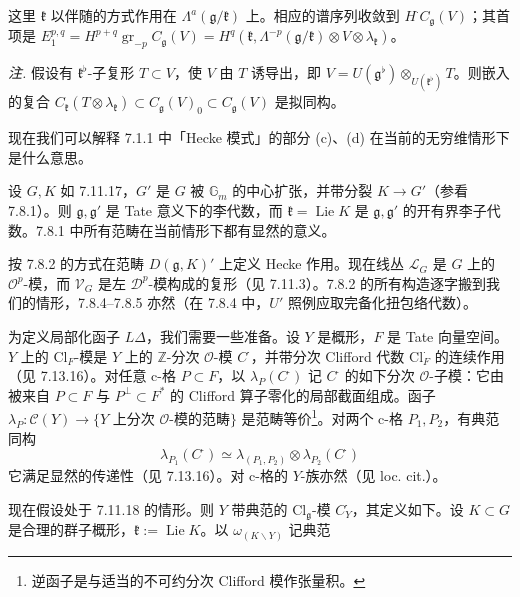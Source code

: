 这里 $\mathfrak{k}$ 以伴随的方式作用在 $\Lambda^{a}(\mathfrak{g}/\mathfrak{k})$ 上。相应的谱序列收敛到 $H^{\cdot}C_{\mathfrak{g}}(V)$；其首项是 $E^{p,q}_{1}=H^{p+q}\operatorname{gr}_{-p}C_{\mathfrak{g}}(V)=H^{q}(\mathfrak{k},\Lambda^{-p}(\mathfrak{g}/\mathfrak{k})\otimes V\otimes\lambda_{\mathfrak{k}})$。

 \emph{注.} 假设有 $\mathfrak{k}^{\flat}$-子复形 $T\subset V$，使 $V$ 由 $T$ 诱导出，即 $V=U(\mathfrak{g}^{\flat})\otimes_{U(\mathfrak{k}^{\flat})}T$。则嵌入的复合 $C_{\mathfrak{k}}(T\otimes\lambda_{\mathfrak{k}})\subset C_{\mathfrak{g}}(V)_{0}\subset C_{\mathfrak{g}}(V)$ 是拟同构。


 现在我们可以解释 7.1.1 中「Hecke 模式」的部分 (c)、(d) 在当前的无穷维情形下是什么意思。

 设 $G,K$ 如 7.11.17，$G'$ 是 $G$ 被 $\mathbb{G}_{m}$ 的中心扩张，并带分裂 $K\to G'$（参看 7.8.1）。则 $\mathfrak{g},\mathfrak{g}'$ 是 Tate 意义下的李代数，而 $\mathfrak{k}=\operatorname{Lie}K$ 是 $\mathfrak{g},\mathfrak{g}'$ 的开有界李子代数。7.8.1 中所有范畴在当前情形下都有显然的意义。

按 7.8.2 的方式在范畴 $D(\mathfrak{g},K)'$ 上定义 Hecke 作用。现在线丛 $\mathcal{L}_{G}$ 是 $G$ 上的 $\mathcal{O}^{p}$-模，而 $\mathcal{V}_{G}$ 是左 $\mathcal{D}^{p}$-模构成的复形（见 7.11.3）。7.8.2 的所有构造逐字搬到我们的情形，7.8.4--7.8.5 亦然（在 7.8.4 中，$U'$ 照例应取完备化扭包络代数）。

 为定义局部化函子 $L\Delta$，我们需要一些准备。设 $Y$ 是概形，$F$ 是 Tate 向量空间。$Y$ 上的 $\mathrm{Cl}_{F}$-模是 $Y$ 上的 $\mathbb{Z}$-分次 $\mathcal{O}$-模 $C^{\cdot}$，并带分次 Clifford 代数 $\mathrm{Cl}^{\cdot}_{F}$ 的连续作用（见 7.13.16）。对任意 c-格 $P\subset F$，以 $\lambda_{P}(C^{\cdot})$ 记 $C^{\cdot}$ 的如下分次 $\mathcal{O}$-子模：它由被来自 $P\subset F$ 与 $P^{\perp}\subset F^{*}$ 的 Clifford 算子零化的局部截面组成。函子 $\lambda_{P}:\mathcal{C}(Y)\to\{Y$ 上分次 $\mathcal{O}$-模的范畴$\}$ 是范畴等价\footnote{逆函子是与适当的不可约分次 Clifford 模作张量积。}。对两个 c-格 $P_{1},P_{2}$，有典范同构
\begin{equation}\tag{377}
\lambda_{P_{1}}(C^{\cdot})\simeq\lambda_{(P_{1},P_{2})}\otimes\lambda_{P_{2}}(C^{\cdot})
\end{equation}
它满足显然的传递性（见 7.13.16）。对 c-格的 $Y$-族亦然（见 loc. cit.）。

 现在假设处于 7.11.18 的情形。则 $Y$ 带典范的 $\mathrm{Cl}_{\mathfrak{g}}$-模 $C^{\cdot}_{Y}$，其定义如下。设 $K\subset G$ 是合理的群子概形，$\mathfrak{k}:=\operatorname{Lie}K$。以 $\omega_{(K\backslash Y)}$ 记典范
